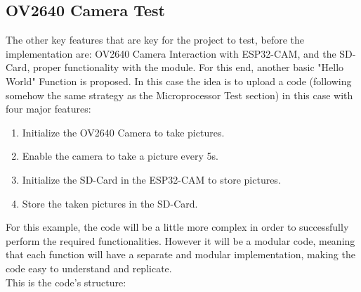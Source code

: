 
\subsection{OV2640 Camera Test}
The other key features that are key for the project to test, before the implementation are: OV2640 Camera Interaction with ESP32-CAM, and the SD-Card, proper functionality with the module. For this end, another basic "Hello World" Function is proposed. In this case the idea is to upload a code (following somehow the same strategy as the Microprocessor Test section) in this case with four major features:
\begin{enumerate}
    \item Initialize the OV2640 Camera to take pictures.
    \item Enable the camera to take a picture every 5s.
    \item Initialize the SD-Card in the ESP32-CAM to store pictures.
    \item Store the taken pictures in the SD-Card. 
\end{enumerate}

For this example, the code will be a little more complex in order to successfully perform the required functionalities. However it will be a modular code, meaning that each function will have a separate and modular implementation, making the code easy to understand and replicate. \\

This is the code's structure:

